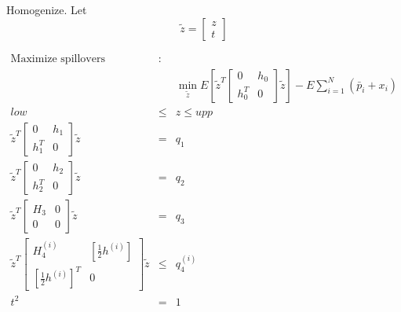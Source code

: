 \documentclass{article}
\begin{document}
Homogenize. Let%
\begin{equation*}
\tilde{z}=\left[ 
\begin{array}{c}
z \\ 
t%
\end{array}%
\right]
\end{equation*}

\begin{eqnarray*}
\text{Maximize spillovers} &\text{:}& \\
&&\min_{\tilde{z}}E\left[ \tilde{z}^{T}\left[ 
\begin{array}{cc}
0 & h_{0} \\ 
h_{0}^{T} & 0%
\end{array}%
\right] \tilde{z}\right] -E\sum_{i=1}^{N}\left( \bar{p}_{i}+x_{i}\right) \\
low &\leq &z\leq upp \\
\tilde{z}^{T}\left[ 
\begin{array}{cc}
0 & h_{1} \\ 
h_{1}^{T} & 0%
\end{array}%
\right] \tilde{z} &=&q_{1} \\
\tilde{z}^{T}\left[ 
\begin{array}{cc}
0 & h_{2} \\ 
h_{2}^{T} & 0%
\end{array}%
\right] \tilde{z} &=&q_{2} \\
\tilde{z}^{T}\left[ 
\begin{array}{cc}
H_{3} & 0 \\ 
0 & 0%
\end{array}%
\right] \tilde{z} &=&q_{3} \\
\tilde{z}^{T}\left[ 
\begin{array}{cc}
H_{4}^{\left( i\right) } & \left[ \frac{1}{2}h^{\left( i\right) }\right] \\ 
\left[ \frac{1}{2}h^{\left( i\right) }\right] ^{T} & 0%
\end{array}%
\right] \tilde{z} &\leq &q_{4}^{\left( i\right) } \\
t^{2} &=&1
\end{eqnarray*}%
\end{document}
